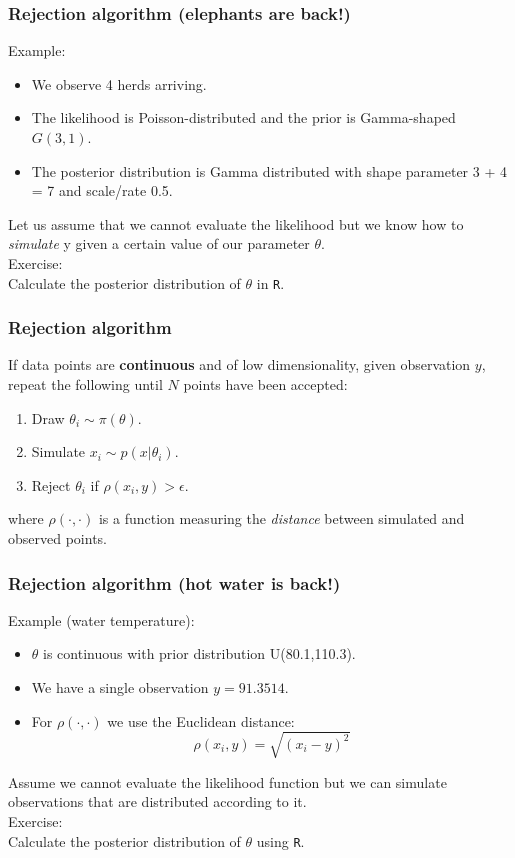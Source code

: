 \documentclass{beamer}
\newcommand{\1}{\ensuremath{\mathbf{1}}}
\begin{document}
\begin{frame}\frametitle{Rejection algorithm (elephants are back!)}
	Example:
	\begin{itemize}
		\item We observe 4 herds arriving.
		\item The likelihood is Poisson-distributed and the prior is Gamma-shaped $G(3,1)$.
		\item The posterior distribution is Gamma distributed with shape parameter 3 + 4 = 7 and scale/rate 0.5.
	\end{itemize}
	Let us assume that we cannot evaluate the likelihood but we know how to \emph{simulate} y given a certain value of our parameter $\theta$.\\
	Exercise:\\
	Calculate the posterior distribution of $\theta$ in \texttt{R}.
\end{frame}
%
%
%
\begin{frame}\frametitle{Rejection algorithm}
	If data points are \textbf{continuous} and of low dimensionality, given observation $y$, repeat the following until $N$ points have been accepted:
	\begin{enumerate}
		\item Draw $\theta_i \sim \pi(\theta)$.
		\item Simulate $x_i \sim p(x|\theta_i)$.
		\item Reject $\theta_i$ if $\rho(x_i, y)>\epsilon$.
	\end{enumerate}
	where $\rho(\cdot,\cdot)$ is a function measuring the \emph{distance} between simulated and observed points.
\end{frame}
%
%
%
\begin{frame}\frametitle{Rejection algorithm (hot water is back!)}
	Example (water temperature):
	\begin{itemize}
		\item $\theta$ is continuous with prior distribution U(80.1,110.3).
		\item We have a single observation $y = 91.3514$.
		\item For $\rho(\cdot,\cdot)$ we use the Euclidean distance:
			\begin{equation}
				\rho(x_i,y) = \sqrt{(x_i-y)^2}
			\end{equation}
	\end{itemize}
	Assume we cannot evaluate the likelihood function but we can simulate observations that are distributed according to it.\\
	Exercise:\\
	Calculate the posterior distribution of $\theta$ using \texttt{R}.
\end{frame}
\end{document}
